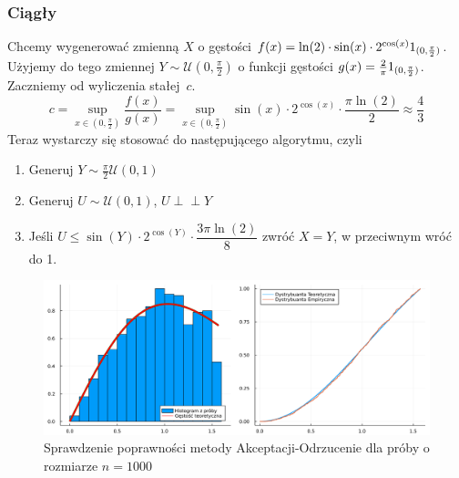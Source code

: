 \documentclass[12pt]{mwrep}
\newcommand{\indep}{\perp \!\!\! \perp}
\begin{document}
	
 
 	\subsubsection{Ciągły}
 	\noindent Chcemy wygenerować zmienną $X$ o gęstości $f(x)= \ln(2)\cdot\sin(x)\cdot2^{\cos(x)}\boldmath 1_{(0,\frac{\pi}{2})}$. Użyjemy do tego zmiennej $Y\sim\mathcal{U}(0,\frac{\pi}{2})$ o funkcji gęstości $g(x)=\frac{2}{\pi}\boldmath 1_{(0,\frac{\pi}{2})}$. Zaczniemy od wyliczenia stałej~$c$.
 	\begin{equation}
 		c=\sup\limits_{x\in(0,\frac{\pi}{2})}\frac{f(x)}{g(x)}=\sup\limits_{x\in(0,\frac{\pi}{2})}\sin(x)\cdot2^{\cos(x)}\cdot\frac{\pi\ln(2)}{2}\approx \frac{4}{3}
 	\end{equation}
 	Teraz wystarczy się stosować do następującego algorytmu, czyli
	\begin{enumerate}[leftmargin=10mm]
		\item Generuj $Y\sim \frac{\pi}{2}\mathcal{U}(0,1)$
		\item Generuj $U\sim \mathcal{U}(0,1)$, $U\indep Y$
		\item Jeśli $U\leqslant\sin(Y)\cdot2^{\cos(Y)}\cdot\dfrac{3\pi\ln(2)}{8}$ zwróć $X=Y$, w przeciwnym wróć do 1.
	\end{enumerate}	
 	

	\begin{figure}[H]\caption{Sprawdzenie poprawności metody Akceptacji-Odrzucenie dla próby o rozmiarze $n=1000$}\label{fig:AO_con}
		\includegraphics[width=\columnwidth]{fig/fig_AO_con.png}
	\end{figure}
	
\end{document}
